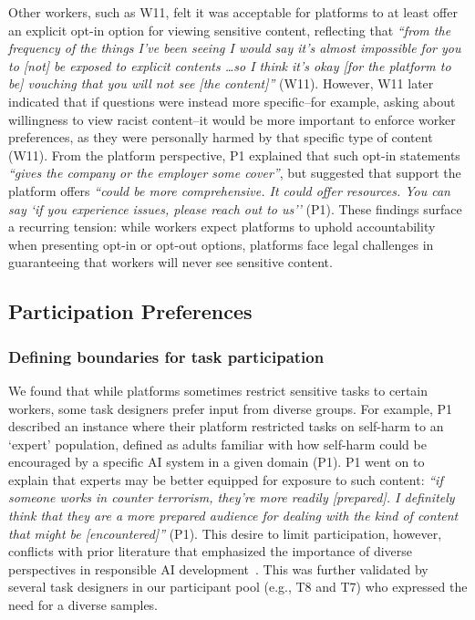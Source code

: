 Other workers, such as W11, felt it was acceptable for platforms to at least offer an explicit opt-in option for viewing sensitive content, reflecting that \textit{``from the frequency of the things I've been seeing I would say it's almost impossible for you to [not] be exposed to explicit contents \dots so I think it's okay [for the platform to be] vouching that you will not see [the content]''} (W11). However, W11 later indicated that if questions were instead more specific--for example, asking about willingness to view racist content--it would be more important to enforce worker preferences, as they were personally harmed by that specific type of content (W11). From the platform perspective, P1 explained that such opt-in statements \textit{``gives the company or the employer some cover''}, but suggested that support the platform offers \textit{``could be more comprehensive. It could offer resources. You can say `if you experience issues, please reach out to us''} (P1). These findings surface a recurring tension: while workers expect platforms to uphold accountability when presenting opt-in or opt-out options, platforms face legal challenges in guaranteeing that workers will never see sensitive content.
 
\subsection{Participation Preferences}
\subsubsection{Defining boundaries for task participation}
We found that while platforms sometimes restrict sensitive tasks to certain workers, some task designers prefer input from diverse groups. For example, P1 described an instance where their platform restricted tasks on self-harm to an `expert' population, defined as adults familiar with how self-harm could be encouraged by a specific AI system in a given domain (P1). P1 went on to explain that experts may be better equipped for exposure to such content: \textit{``if someone works in counter terrorism, they're more readily [prepared]. I definitely think that they are a more prepared audience for dealing with the kind of content that might be [encountered]''} (P1). This desire to limit participation, however, conflicts with prior literature that emphasized the importance of diverse perspectives in responsible AI development~\cite{qian2025locating, dalal2024provocation}. This was further validated by several task designers in our participant pool (e.g., T8 and T7) who expressed the need for a diverse samples. 

